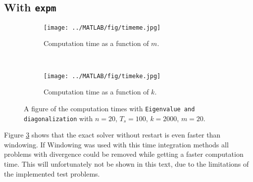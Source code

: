 \subsection{With \texttt{expm}}
\begin{figure}[H]
        \centering
        \begin{subfigure}[b]{0.45\textwidth}
                \texttt{[image: ../MATLAB/fig/timeme.jpg]}
                \caption{ Computation time as a function of $m$. }
                \label{fig:timeme}
        \end{subfigure}
        ~
        \begin{subfigure}[b]{0.45\textwidth}
                \texttt{[image: ../MATLAB/fig/timeke.jpg]}
                \caption{ Computation time as a function of $k$. }
                \label{fig:timeke}
        \end{subfigure}
        \caption{ A figure of the computation times with \texttt{Eigenvalue and diagonalization} with $n = 20$, $T_s = 100$, $k = 2000$, $m = 20$. }
        \label{fig:time3}
\end{figure}
Figure \ref{fig:time3} shows that the exact solver without restart is even faster than windowing. If Windowing was used with this time integration methods all problems with divergence could be removed while getting a faster computation time. This will unfortunately not be shown in this text, due to the limitations of the implemented test problems.

